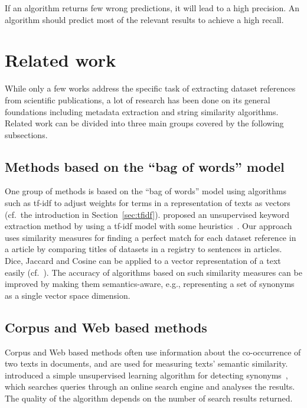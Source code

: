 \documentclass{IOS-Book-Article}
\begin{document}
If an algorithm returns few wrong predictions, it will lead to a high precision.
An algorithm should predict most of the relevant results to achieve a high recall.

\section{Related work}
\label{sec:relWork}
While only a few works address the specific task of extracting dataset references from scientific publications, a lot of research has been done on its general foundations including metadata extraction and string similarity algorithms. 
Related work can be divided into three main groups covered by the following subsections.
\subsection{Methods based on the “bag of words” model}
One group of methods is based on the “bag of words” model using algorithms such as tf-idf to adjust weights for terms in a representation of texts as vectors (cf.\ the introduction in Section~\ref{sec:tfidf}).
\citeauthor{Lee2008} proposed an unsupervised keyword extraction method by using a tf-idf model with some heuristics~\citeyearpar{Lee2008}.
Our approach uses similarity measures for finding a perfect match for each dataset reference in a article by comparing titles of datasets in a registry to sentences in articles.
Dice, Jaccard and Cosine can be applied to a vector representation of a text easily (cf.~\citet{ChristopherD1999}).
The accuracy of algorithms based on such similarity measures can be improved by making them semantics-aware, e.g., representing a set of synonyms as a single vector space dimension.

\subsection{Corpus and Web based methods}
Corpus and Web based methods often use information about the co-occurrence of two texts in documents, and are used for measuring texts' semantic similarity.
\citeauthor{Turney2001} introduced a simple unsupervised learning algorithm for detecting synonyms~\citeyearpar{Turney2001}, which searches queries through an online search engine and analyses the results.
The quality of the algorithm depends on the number of search results returned.  
\end{document}
